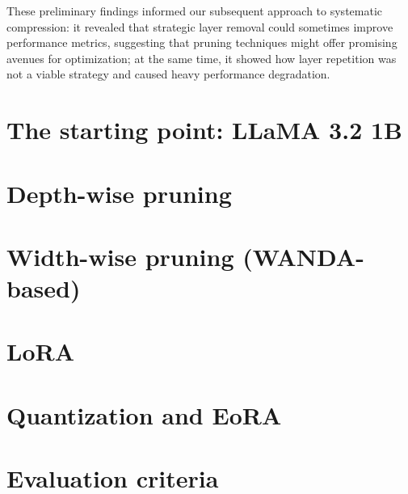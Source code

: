 These preliminary findings informed our subsequent approach to systematic compression: it revealed that strategic layer removal could sometimes improve performance metrics, suggesting that pruning techniques might offer promising avenues for optimization; at the same time, it showed how layer repetition was not a viable strategy and caused heavy performance degradation.
\section{The starting point: LLaMA 3.2 1B}
\section{Depth-wise pruning} \label{depth_pruning}
\section{Width-wise pruning (WANDA-based)} \label{wanda}
\section{LoRA}
\section{Quantization and EoRA}
\section{Evaluation criteria}